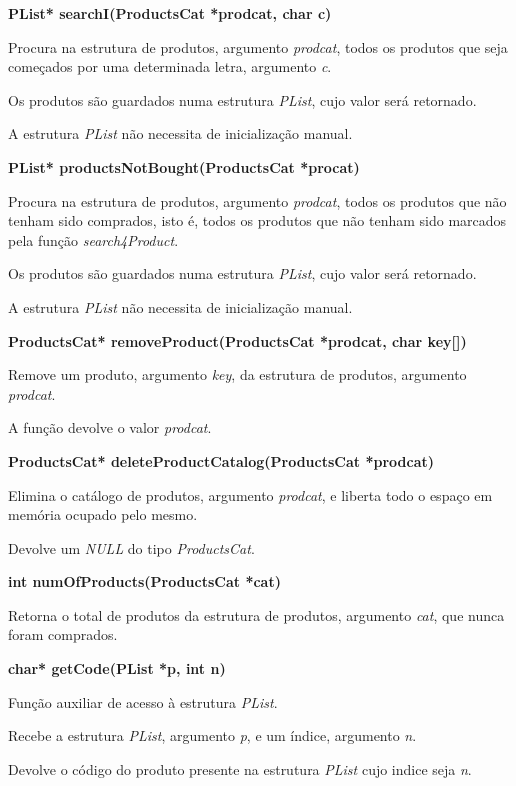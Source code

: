 \documentclass[10pt] {article}
\begin{document}
\noindent \textbf{PList* searchI(ProductsCat *prodcat, char c)}
\par Procura na estrutura de produtos, argumento \emph{prodcat}, todos os produtos que seja começados por uma determinada letra, argumento \emph{c}.
\par Os produtos são guardados numa estrutura \emph{PList}, cujo valor será retornado.
\par A estrutura \emph{PList} não necessita de inicialização manual.

\noindent \textbf{PList* productsNotBought(ProductsCat *procat)}
\par Procura na estrutura de produtos, argumento \emph{prodcat}, todos os produtos que não tenham sido comprados, isto é, todos os produtos que não tenham sido marcados pela função \emph{search4Product}.
\par Os produtos são guardados numa estrutura \emph{PList}, cujo valor será retornado.
\par A estrutura \emph{PList} não necessita de inicialização manual.

\noindent \textbf{ProductsCat* removeProduct(ProductsCat *prodcat, char key[])}
\par Remove um produto, argumento \emph{key}, da estrutura de produtos, argumento \emph{prodcat}.
\par A função devolve o valor \emph{prodcat}.

\noindent \textbf{ProductsCat* deleteProductCatalog(ProductsCat *prodcat)}
\par Elimina o catálogo de produtos, argumento \emph{prodcat}, e liberta todo o espaço em memória ocupado pelo mesmo.
\par Devolve um \emph{NULL} do tipo \emph{ProductsCat}.

\noindent \textbf{int numOfProducts(ProductsCat *cat)}
\par Retorna o total de produtos da estrutura de produtos, argumento \emph{cat}, que nunca foram comprados.

\noindent \textbf{char* getCode(PList *p, int n)}
\par Função auxiliar de acesso à estrutura \emph{PList}.
\par Recebe a estrutura \emph{PList}, argumento \emph{p}, e um índice, argumento \emph{n}.
\par Devolve o código do produto presente na estrutura \emph{PList} cujo indice seja \emph{n}.
\end{document}

